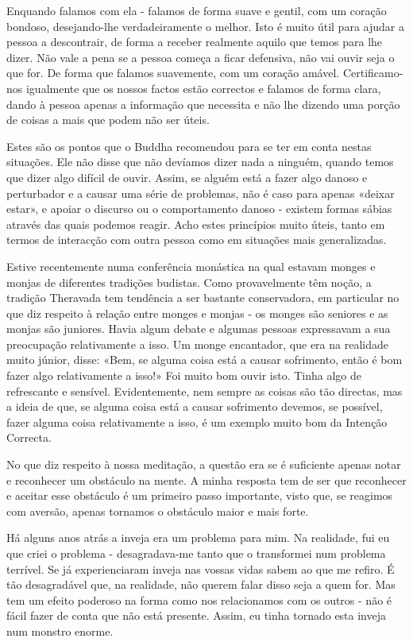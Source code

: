 Enquando falamos com ela - falamos de forma suave e gentil, com um
coração bondoso, desejando-lhe verdadeiramente o melhor. Isto é muito
útil para ajudar a pessoa a descontrair, de forma a receber realmente
aquilo que temos para lhe dizer. Não vale a pena se a pessoa começa a
ficar defensiva, não vai ouvir seja o que for. De forma que falamos
suavemente, com um coração amável. Certificamo-nos igualmente que os
nossos factos estão correctos e falamos de forma clara, dando à pessoa
apenas a informação que necessita e não lhe dizendo uma porção de coisas
a mais que podem não ser úteis.

Estes são os pontos que o Buddha recomendou para se ter em conta nestas
situações. Ele não disse que não devíamos dizer nada a ninguém, quando
temos que dizer algo difícil de ouvir. Assim, se alguém está a fazer
algo danoso e perturbador e a causar uma série de problemas, não é caso
para apenas «deixar estar», e apoiar o discurso ou o comportamento
danoso - existem formas sábias através das quais podemos reagir. Acho
estes princípios muito úteis, tanto em termos de interacção com outra
pessoa como em situações mais generalizadas.

Estive recentemente numa conferência monástica na qual estavam monges e
monjas de diferentes tradições budistas. Como provavelmente têm noção, a
tradição Theravada tem tendência a ser bastante conservadora, em
particular no que diz respeito à relação entre monges e monjas - os
monges são seniores e as monjas são juniores. Havia algum debate e
algumas pessoas expressavam a sua preocupação relativamente a isso. Um
monge encantador, que era na realidade muito júnior, disse: «Bem, se
alguma coisa está a causar sofrimento, então é bom fazer algo
relativamente a isso!» Foi muito bom ouvir isto. Tinha algo de
refrescante e sensível. Evidentemente, nem sempre as coisas são tão
directas, mas a ideia de que, se alguma coisa está a causar sofrimento
devemos, se possível, fazer alguma coisa relativamente a isso, é um
exemplo muito bom da Intenção Correcta.

No que diz respeito à nossa meditação, a questão era se é suficiente
apenas notar e reconhecer um obstáculo na mente. A minha resposta tem de
ser que reconhecer e aceitar esse obstáculo é um primeiro passo
importante, visto que, se reagimos com aversão, apenas tornamos o
obstáculo maior e mais forte.

Há alguns anos atrás a inveja era um problema para mim. Na realidade,
fui eu que criei o problema - desagradava-me tanto que o transformei num
problema terrível. Se já experienciaram inveja nas vossas vidas sabem ao
que me refiro. É tão desagradável que, na realidade, não querem falar
disso seja a quem for. Mas tem um efeito poderoso na forma como nos
relacionamos com os outros - não é fácil fazer de conta que não está
presente. Assim, eu tinha tornado esta inveja num monstro enorme.

